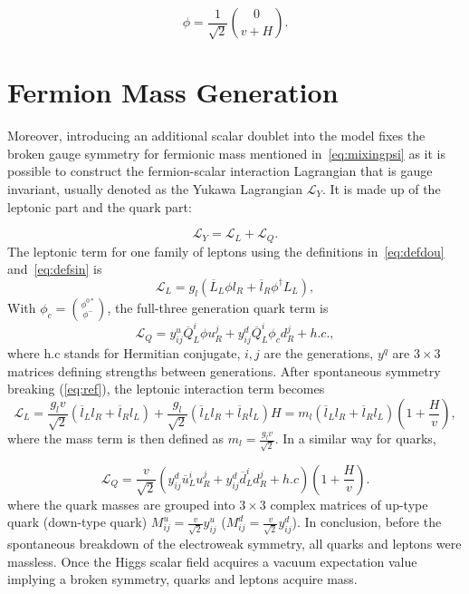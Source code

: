 \begin{equation}
\phi=\frac{1}{\sqrt{2}}\binom{0}{v+H}.
\label{eq:ref}
\end{equation}


\section{Fermion Mass Generation}
\label{mass}
Moreover, introducing an additional scalar doublet into the model fixes the broken gauge symmetry for fermionic mass mentioned in~\autoref{eq:mixingpsi} as it is possible to construct the fermion-scalar interaction Lagrangian that is gauge invariant, usually denoted as the Yukawa Lagrangian $\mathcal{L}_{Y}$. It is made up of the leptonic part and the quark part:

\begin{equation}
	\mathcal{L}_{Y}= \mathcal{L}_{L} + \mathcal{L}_{Q}.
\end{equation}
The leptonic term for one family of leptons using the definitions in~\autoref{eq:defdou} and~\autoref{eq:defsin} is
\begin{equation}
	\mathcal{L}_{L}= g_{l}(\overline{L}_{L}\phi l_{R} + \overline{l}_{R} \phi^{\dagger} L_{L}), 
	\label{eq:SSB1}
\end{equation}
With $\phi_{c}=\binom{\phi^{0*}}{\phi^{-}}$, the full-three generation quark term is
\begin{equation}
	\mathcal{L}_{Q}= y^{u}_{ij}\overline{Q}^{i}_{L}\phi u^{j}_{R} + {y}^{d}_{ij}\overline{Q}^{i}_{L}\phi_{c} d^{j}_{R} + h.c .,
	\label{eq:SSB2}
\end{equation}
where h.c stands for Hermitian conjugate, $i,j$ are the generations, $y^{q}$ are $3\times3$ matrices defining strengths between generations. After spontaneous symmetry breaking (\autoref{eq:ref}), the leptonic interaction term becomes
\begin{equation}
	\mathcal{L}_{L}= \frac{g_{l}v}{\sqrt{2}}(\overline{l}_{L}l_{R} + \overline{l}_{R}l_{L}) + \frac{g_{l}}{\sqrt{2}}(\overline{l}_{L} l_{R}+\overline{l}_{R} l_{L})H = m_{l}(\overline{l}_{L}l_{R} + \overline{l}_{R}l_{L})(1+\frac{H}{v}),
        \label{eq:SSB3}
\end{equation}
where the mass term is then defined as $m_{l}=\frac{g_{l}v}{\sqrt{2}}$. In a similar way for quarks,


\begin{equation}
	\mathcal{L}_{Q}=\frac{v}{\sqrt{2}}(y^{d}_{ij}\overline{u}^{i}_{L} u^{j}_{R} + {y}_{ij}^{d}\overline{d}^{i}_{L} d^{j}_{R} + h.c)(1+\frac{H}{v}).
	\label{eq:SSB4}
\end{equation}
where the quark masses are grouped into $3\times3$ complex matrices of up-type quark (down-type quark) $M^{u}_{ij}=\frac{v}{\sqrt{2}}y_{ij}^{u}$ ($M^{d}_{ij}=\frac{v}{\sqrt{2}}y_{ij}^{d}$).
In conclusion, before the spontaneous breakdown of the electroweak symmetry, all quarks and leptons were massless. Once the Higgs scalar field acquires a vacuum expectation value implying a broken symmetry, quarks and leptons acquire mass. %

